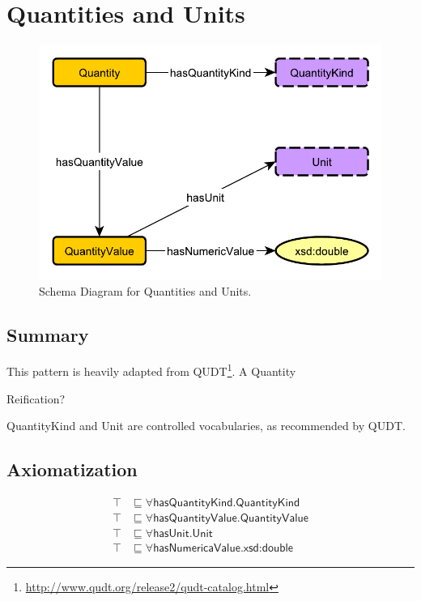 \section{Quantities and Units}
\label{sec:Quantities}
\begin{figure}[h!]
\begin{center}
\includegraphics[width=.7\textwidth]{figures/quantities}
\end{center}
\caption{Schema Diagram for Quantities and Units.}
\label{fig:Quantities}
\end{figure}
\subsection{Summary}
\label{sum:Quantities}
This pattern is heavily adapted from QUDT\footnote{\url{http://www.qudt.org/release2/qudt-catalog.html}}. A \textsf{Quantity} 

Reification?

\textsf{QuantityKind} and \textsf{Unit} are controlled vocabularies, as recommended by QUDT.

\subsection{Axiomatization}
\label{axs:Quantities}
\begin{align}
\top &\sqsubseteq \forall \textsf{hasQuantityKind.QuantityKind} \\
\top &\sqsubseteq \forall \textsf{hasQuantityValue.QuantityValue} \\
\top &\sqsubseteq \forall \textsf{hasUnit.Unit} \\
\top &\sqsubseteq \forall \textsf{hasNumericaValue.xsd:double}
\end{align}


